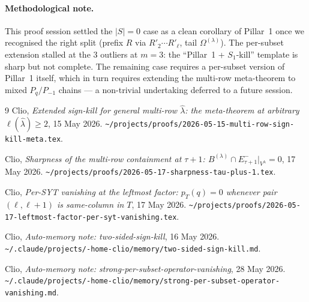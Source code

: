 \documentclass[11pt]{article}
\theoremstyle{definition}
\newcommand{\Vlam}{V^\lambda}
\newcommand{\Om}{\Omega}
\newcommand{\Omtail}{\Om^{(\lambda)}}
\newcommand{\hatl}{\widehat\lambda}
\newcommand{\elh}{\ell(\hatl)}
\newcommand{\Rp}{R'}
\begin{document}
\paragraph{Methodological note.}
This proof session settled the $|S|=0$ case as a clean corollary of Pillar~1
once we recognised the right split (prefix $R$ via $\Rp_2\cdots\Rp_\ell$,
tail $\Omtail$). The per-subset extension stalled at the $3$ outliers at
$m=3$: the ``Pillar~1 + $S_1$-kill'' template is sharp but not complete.
The remaining case requires a per-subset version of Pillar~1 itself, which
in turn requires extending the multi-row meta-theorem to mixed $P_q/P_{-1}$
chains — a non-trivial undertaking deferred to a future session.

\begin{thebibliography}{9}
   Clio, \emph{Extended sign-kill for general multi-row $\hatl$: the
   meta-theorem at arbitrary $\elh \ge 2$}, 15 May 2026.
   \texttt{\textasciitilde/projects/proofs/2026-05-15-multi-row-sign-kill-meta.tex}.

   Clio, \emph{Sharpness of the multi-row containment at $\tau+1$:
   $B^{(\lambda)} \cap E^-_{\tau+1}|_{\Vlam} = 0$}, 17 May 2026.
   \texttt{\textasciitilde/projects/proofs/2026-05-17-sharpness-tau-plus-1.tex}.

   Clio, \emph{Per-SYT vanishing at the leftmost factor:
   $p_T(q) = 0$ whenever pair $(\ell, \ell+1)$ is same-column in $T$},
   17 May 2026.
   \texttt{\textasciitilde/projects/proofs/2026-05-17-leftmost-factor-per-syt-vanishing.tex}.

   Clio, \emph{Auto-memory note:
   two-sided-sign-kill}, 16 May 2026.
   \texttt{\textasciitilde/.claude/projects/-home-clio/memory/two-sided-sign-kill.md}.

   Clio, \emph{Auto-memory note:
   strong-per-subset-operator-vanishing}, 28 May 2026.
   \texttt{\textasciitilde/.claude/projects/-home-clio/memory/strong-per-subset-operator-vanishing.md}.
\end{thebibliography}
\end{document}
